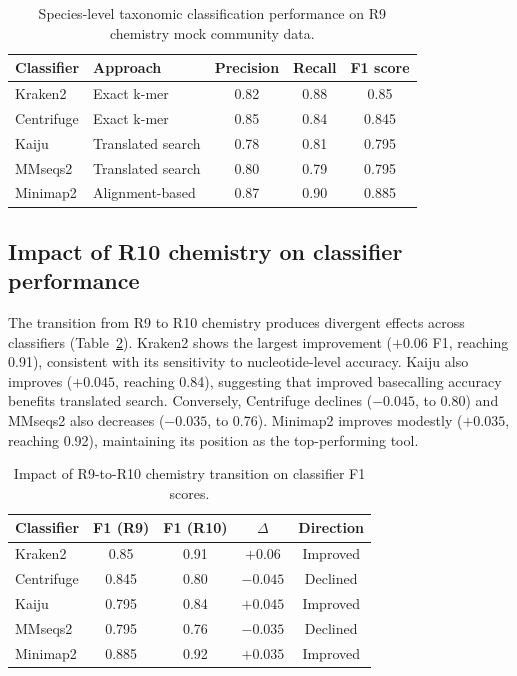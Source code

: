 \documentclass[11pt]{article}
\begin{document}
\begin{table}[htbp]
\centering
\caption{Species-level taxonomic classification performance on R9 chemistry mock community data.}
\label{tab:r9}
\begin{tabular}{@{}llccc@{}}
\toprule
Classifier & Approach & Precision & Recall & F1 score \\
\midrule
Kraken2    & Exact k-mer       & 0.82 & 0.88 & 0.85  \\
Centrifuge & Exact k-mer       & 0.85 & 0.84 & 0.845 \\
Kaiju      & Translated search & 0.78 & 0.81 & 0.795 \\
MMseqs2    & Translated search & 0.80 & 0.79 & 0.795 \\
Minimap2   & Alignment-based   & 0.87 & 0.90 & 0.885 \\
\bottomrule
\end{tabular}
\end{table}

\subsection{Impact of R10 chemistry on classifier performance}

The transition from R9 to R10 chemistry produces divergent effects across classifiers (Table~\ref{tab:chemistry}). Kraken2 shows the largest improvement ($+0.06$ F1, reaching 0.91), consistent with its sensitivity to nucleotide-level accuracy. Kaiju also improves ($+0.045$, reaching 0.84), suggesting that improved basecalling accuracy benefits translated search. Conversely, Centrifuge declines ($-0.045$, to 0.80) and MMseqs2 also decreases ($-0.035$, to 0.76). Minimap2 improves modestly ($+0.035$, reaching 0.92), maintaining its position as the top-performing tool.

\begin{table}[htbp]
\centering
\caption{Impact of R9-to-R10 chemistry transition on classifier F1 scores.}
\label{tab:chemistry}
\begin{tabular}{@{}lcccc@{}}
\toprule
Classifier & F1 (R9) & F1 (R10) & $\Delta$ & Direction \\
\midrule
Kraken2    & 0.85  & 0.91 & $+0.06$  & Improved \\
Centrifuge & 0.845 & 0.80 & $-0.045$ & Declined \\
Kaiju      & 0.795 & 0.84 & $+0.045$ & Improved \\
MMseqs2    & 0.795 & 0.76 & $-0.035$ & Declined \\
Minimap2   & 0.885 & 0.92 & $+0.035$ & Improved \\
\bottomrule
\end{tabular}
\end{table}
\end{document}
